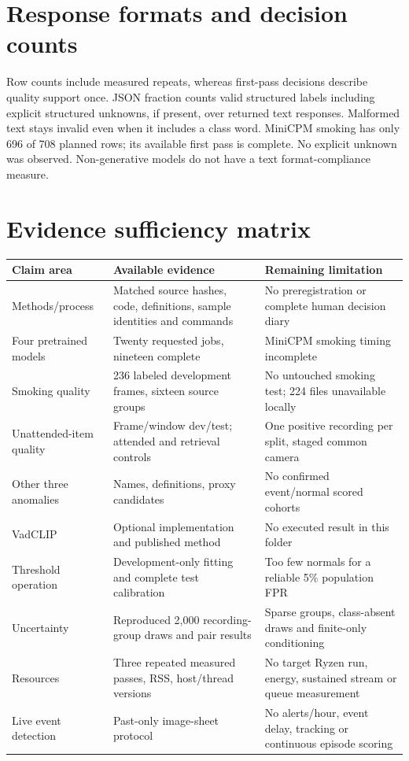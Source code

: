 \documentclass[11pt,a4paper]{article}
\begin{document}
\clearpage\section{Response formats and decision counts}
\small\normalsize
Row counts include measured repeats, whereas first-pass decisions describe quality support once. JSON fraction counts valid structured labels including explicit structured unknowns, if present, over returned text responses. Malformed text stays invalid even when it includes a class word. MiniCPM smoking has only 696 of 708 planned rows; its available first pass is complete. No explicit unknown was observed. Non-generative models do not have a text format-compliance measure.

\section{Evidence sufficiency matrix}
\begin{longtable}{P{4.2cm}P{5.2cm}P{5.5cm}}\toprule Claim area & Available evidence & Remaining limitation\\\midrule\endhead
Methods/process & Matched source hashes, code, definitions, sample identities and commands & No preregistration or complete human decision diary\\
Four pretrained models & Twenty requested jobs, nineteen complete & MiniCPM smoking timing incomplete\\
Smoking quality & 236 labeled development frames, sixteen source groups & No untouched smoking test; 224 files unavailable locally\\
Unattended-item quality & Frame/window dev/test; attended and retrieval controls & One positive recording per split, staged common camera\\
Other three anomalies & Names, definitions, proxy candidates & No confirmed event/normal scored cohorts\\
VadCLIP & Optional implementation and published method & No executed result in this folder\\
Threshold operation & Development-only fitting and complete test calibration & Too few normals for a reliable 5\% population FPR\\
Uncertainty & Reproduced 2,000 recording-group draws and pair results & Sparse groups, class-absent draws and finite-only conditioning\\
Resources & Three repeated measured passes, RSS, host/thread versions & No target Ryzen run, energy, sustained stream or queue measurement\\
Live event detection & Past-only image-sheet protocol & No alerts/hour, event delay, tracking or continuous episode scoring\\
\bottomrule\end{longtable}
\end{document}
